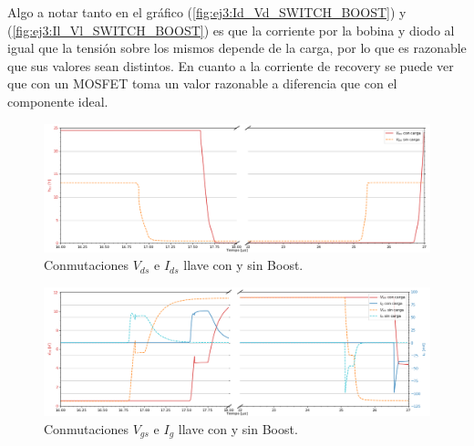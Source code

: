 Algo a notar tanto en el gráfico (\ref{fig:ej3:Id_Vd_SWITCH_BOOST}) y (\ref{fig:ej3:Il_Vl_SWITCH_BOOST}) es que la corriente por la bobina y diodo al igual que la tensión sobre los mismos  depende de la carga, por lo que es razonable que sus valores sean distintos. En cuanto a la corriente de recovery se puede ver que con un MOSFET toma un valor razonable a diferencia que con el componente ideal. 
\begin{multicols}{2}
\begin{figure}[H]
	\centering
	\includegraphics[width=0.9\linewidth]{ImagenesEjercicio-3/ids-vds-1v3}
	\caption{Conmutaciones $V_{ds}$ e  $I_{ds}$ llave con y sin Boost.}
	\label{fig:ej3:conmutacionON_OFF_VDS_IDS_SWITCH_BOOST}
\end{figure}
\begin{figure}[H]
	\centering
	\includegraphics[width=0.9\linewidth]{ImagenesEjercicio-3/ig-vgs-1v3}
	\caption{Conmutaciones $V_{gs}$ e  $I_{g}$ llave con y sin Boost.}
	\label{fig:ej3:conmutacionON_OFF_VGS_IG_SWITCH_BOOST}
\end{figure}
\end{multicols}
